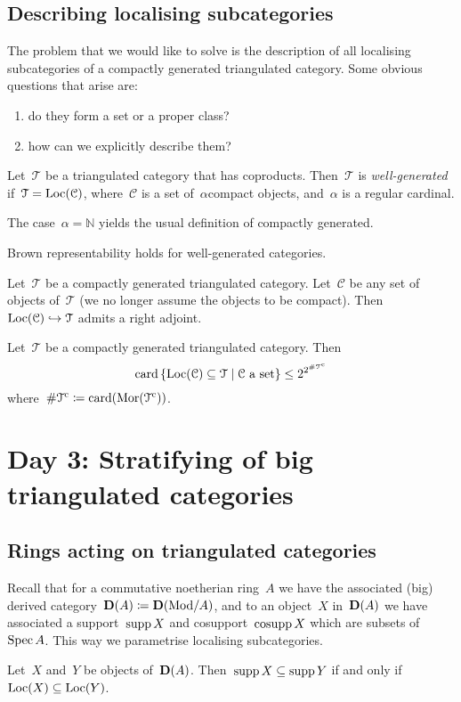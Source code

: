 \documentclass[10pt,a4paper]{article}
\begin{document}
\subsection{Describing localising subcategories}
The problem that we would like to solve is the description of all localising subcategories of a compactly generated triangulated category. Some obvious questions that arise are:
\begin{enumerate}
  \item do they form a set or a proper class?
  \item how can we explicitly describe them?
\end{enumerate}

\begin{definition}
  Let~$\mathcal{T}$ be a triangulated category that has coproducts. Then~$\mathcal{T}$ is \emph{well-generated} if~$\mathcal{T}=\operatorname{Loc}(\mathcal{C})$, where~$\mathcal{C}$ is a set of~$\alpha$\dash compact objects, and~$\alpha$ is a regular cardinal.
\end{definition}
The case~$\alpha=\mathbb{N}$ yields the usual definition of compactly generated.
\begin{theorem}
  Brown representability holds for well-generated categories.
\end{theorem}
\begin{corollary}
  Let~$\mathcal{T}$ be a compactly generated triangulated category. Let~$\mathcal{C}$ be any set of objects of~$\mathcal{T}$ (we no longer assume the objects to be compact). Then~$\operatorname{Loc}(\mathcal{C})\hookrightarrow\mathcal{T}$ admits a right adjoint.
\end{corollary}
\begin{theorem}
  Let~$\mathcal{T}$ be a compactly generated triangulated category. Then
  \begin{equation}
    \operatorname{card}\left\{ \operatorname{Loc}(\mathcal{C})\subseteq\mathcal{T}\mid\text{$\mathcal{C}$ a set} \right\}\leq 2^{2^{\#\mathcal{T}^{\mathrm{c}}}}
  \end{equation}
  where~$\#\mathcal{T}^{\mathrm{c}}\coloneqq\operatorname{card}(\operatorname{Mor}(\mathcal{T}^{\mathrm{c}}))$.
\end{theorem}

\section{Day 3: Stratifying of big triangulated categories}
\subsection{Rings acting on triangulated categories}
Recall that for a commutative noetherian ring~$A$ we have the associated (big) derived category~$\mathbf{D}(A)\coloneqq\mathbf{D}(\mathrm{Mod}/A)$, and to an object~$X$ in~$\mathbf{D}(A)$ we have associated a support~$\operatorname{supp} X$ and cosupport~$\operatorname{cosupp} X$ which are subsets of~$\operatorname{Spec} A$. This way we parametrise localising subcategories.
\begin{lemma}
  Let~$X$ and~$Y$ be objects of~$\mathbf{D}(A)$. Then~$\operatorname{supp} X\subseteq \operatorname{supp} Y$ if and only if~$\operatorname{Loc}(X)\subseteq\operatorname{Loc}(Y)$.
\end{lemma}
\end{document}
